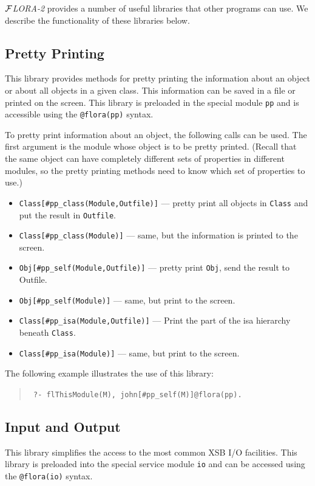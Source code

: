 \documentclass[11pt]{article}
\newcommand{\FLORA}{{\mbox{${\cal F}${\small\it LORA}\rm\emph{-2}}}\xspace}
\begin{document}
\FLORA provides a number of useful libraries that other programs can
use. We describe the functionality of these libraries below.

\subsection{Pretty Printing}

This library provides methods for pretty printing the information about an
object or about all objects in a given class. This information can be saved
in a file or printed on the screen. This library is preloaded in the
special module {\tt pp} and is accessible using the {\tt @flora(pp)}
syntax.

To pretty print information about an object, the following calls can be
used.  The first argument is the module whose object is to be pretty
printed. (Recall that the same object can have completely different sets of
properties in different modules, so the pretty printing methods need to
know which set of properties to use.)
\begin{itemize}
  \item  {\tt Class[\#pp\_class(Module,Outfile)]} --- pretty print all
  objects in {\tt Class} and put the result in {\tt Outfile}.
\item {\tt Class[\#pp\_class(Module)]} --- same, but the information is
  printed to the screen.
\item {\tt Obj[\#pp\_self(Module,Outfile)]} --- pretty print {\tt Obj}, send
  the result to Outfile.
\item {\tt Obj[\#pp\_self(Module)]} --- same, but print to the screen.
\item {\tt Class[\#pp\_isa(Module,Outfile)]} --- Print the part of the isa
  hierarchy beneath {\tt Class}.
\item {\tt Class[\#pp\_isa(Module)]} --- same, but print to the screen.
\end{itemize}
The following example illustrates the use of this library:
\begin{quote}
 {\tt
   ?- flThisModule(M), john[\#pp\_self(M)]@flora(pp).
   }
\end{quote}

\subsection{Input and Output}

This library simplifies the access to the most common XSB I/O facilities.
This library is preloaded into the special service module {\tt io} and
can be accessed using the {\tt @flora(io)} syntax.
\end{document}
